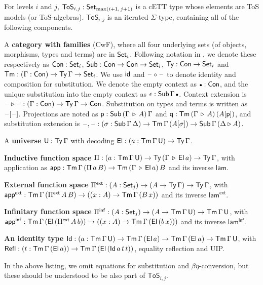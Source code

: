 \documentclass[sigplan,review,anonymous]{acmart}\settopmatter{printfolios=true,printccs=false,printacmref=false}
\newcommand{\ToS}{\mathsf{ToS}}
\newcommand{\ext}{\triangleright}
\newcommand{\emptycon}{\scaleobj{.75}\bullet}
\newcommand{\Pii}{\Pi}
\newcommand{\appi}{\mathsf{app}}
\newcommand{\lami}{\mathsf{lam}}
\newcommand{\Pie}{\Pi^{\mathsf{ext}}}
\newcommand{\appe}{\mathsf{app^{ext}}}
\newcommand{\lame}{\mathsf{lam^{ext}}}
\newcommand{\Piinf}{\Pi^{\mathsf{inf}}}
\newcommand{\appinf}{\mathsf{app^{inf}}}
\newcommand{\laminf}{\mathsf{lam^{inf}}}
\newcommand{\Refl}{\mathsf{Refl}}
\newcommand{\p}{\mathsf{p}}
\newcommand{\q}{\mathsf{q}}
\begin{document}
\begin{definition}\label{def:tos}
For levels $i$ and $j$, $\ToS_{i,j} : \Set_{\max(i+1,\,j+1)}$ is a cETT type whose
elements are ToS models (or ToS-algebras). $\ToS_{i,j}$ is an iterated
$\Sigma$-type, containing all of the following components.

A \textbf{category with families} (CwF), where all four underlying sets (of
objects, morphisms, types and terms) are in $\mathsf{Set}_i$. Following notation in
\cite{kaposi2019constructing}, we denote these respectively as $\mathsf{Con} : \mathsf{Set}_i$,
$\mathsf{Sub} : \mathsf{Con} \rightarrow \mathsf{Con} \rightarrow \mathsf{Set}_i$, $\mathsf{Ty} : \mathsf{Con} \rightarrow \mathsf{Set}_i$ and $\mathsf{Tm} : (\Gamma :
\mathsf{Con}) \rightarrow \mathsf{Ty}\,\Gamma \rightarrow \mathsf{Set}_i$. We use $\mathsf{id}$ and $\mathord{\hspace{1pt}\text{--}\hspace{1pt}}\circ\mathord{\hspace{1pt}\text{--}\hspace{1pt}}$ to
denote identity and composition for substitution. We denote the empty context as
$\emptycon : \Con$, and the unique substitution into the empty context as
$\epsilon : \Sub\,\Gamma\,\emptycon$. Context extension is $\blank\ext\blank :
(\Gamma : \Con)\ra \Ty\,\Gamma \ra \Con$. Substitution on types and terms is
written as $\mathord{\hspace{1pt}\text{--}\hspace{1pt}}[\mathord{\hspace{1pt}\text{--}\hspace{1pt}}]$. Projections are noted as $\p :
\Sub\,(\Gamma\,\ext\,A)\,\Gamma$ and $\q : \Tm\,(\Gamma\,\ext\,A)\,(A[\p])$, and
substitution extension is $\blank,\blank : (\sigma : \Sub\,\Gamma\,\Delta)\ra
\Tm\,\Gamma\,(A[\sigma])\ra \Sub\,\Gamma\,(\Delta\ext A)$.

A \textbf{universe} $\mathsf{U} : \mathsf{Ty}\,\Gamma$ with decoding $\mathsf{El} : (a :
\mathsf{Tm}\,\Gamma\,\mathsf{U}) \rightarrow \mathsf{Ty}\,\Gamma$.

\textbf{Inductive function space} $\Pii : (a : \Tm\,\Gamma\,\U) \ra
\Ty\,(\Gamma\,\ext\,\El\,a) \ra \Ty\,\Gamma$, with application as $\appi :
\Tm\,\Gamma\,(\Pii\,a\,B)\ra \Tm\,(\Gamma\,\ext\,\El\,a)\,B$ and its
inverse $\lami$.

\textbf{External function space} $\Pie : (A : \Set_j)\ra(A \ra \Ty\,\Gamma)\ra
\Ty\,\Gamma$, with $\appe : \Tm\,\Gamma\,(\Pie\,A\,B)\ra((x : A)\ra
\Tm\,\Gamma\,(B\,x))$ and its inverse $\lame$.

\textbf{Infinitary function space} $\Piinf : (A : \Set_j)\ra(A \ra
\Tm\,\Gamma\,\U)\ra \Tm\,\Gamma\,\U$, with $\appinf :
\Tm\,\Gamma\,(\El\,(\Pie\,A\,b))\ra((x : A)\ra \Tm\,\Gamma\,(\El\,(b\,x)))$ and
its inverse $\laminf$.

\textbf{An identity type} $\mathsf{Id} : (a : \mathsf{Tm}\,\Gamma\,\mathsf{U})\rightarrow
\mathsf{Tm}\,\Gamma\,(\mathsf{El}\,a)\rightarrow\mathsf{Tm}\,\Gamma\,(\mathsf{El}\,a)\rightarrow \mathsf{Tm}\,\Gamma\,\mathsf{U}$, with $\Refl :
(t : \Tm\,\Gamma\,(\El\,a))\ra \Tm\,\Gamma\,(\El\,(\Id\,a\,t\,t))$, equality reflection and UIP.

\end{definition}
In the above listing, we omit equations for substitution and
$\beta\eta$-conversion, but these should be understood to be also part of
$\ToS_{i,j}$.
\end{document}
